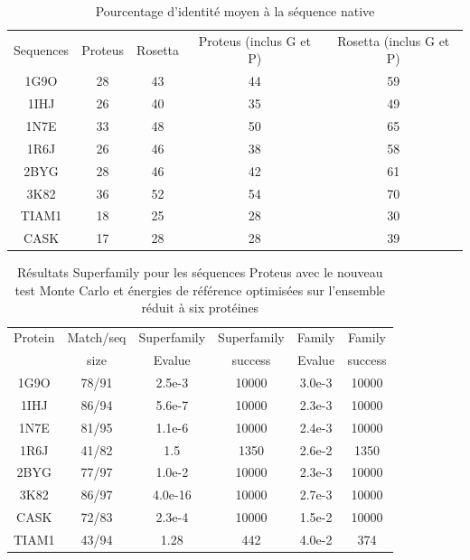     \begin{table}[!htbp]
      \centering

      \begin{tabular}{ccccc}

        \toprule
        Sequences & Proteus & Rosetta & Proteus (inclus G et P) & Rosetta (inclus G et P)\\
        \cmidrule{1-5}
        1G9O  & 28 &  43 & 44 & 59 \\
        1IHJ  & 26 &  40 & 35 & 49 \\
        1N7E  & 33 &  48 & 50 & 65 \\
        1R6J  & 26 &  46 & 38 & 58 \\
        2BYG  & 28 &  46 & 42 & 61 \\
        3K82  & 36 &  52 & 54 & 70 \\
        TIAM1 & 18 &  25 & 28 & 30 \\
        CASK  & 17 &  28 & 28 &  39 \\

        \bottomrule

      \end{tabular}      
      \caption{Pourcentage d'identité moyen à la séquence native}
\label{tab:Entropie_PDZ}      
    \end{table}



\begin{table}[h]
  \raggedleft{}
  
  \begin{tabular}{cccccc}
    
    \toprule
    Protein & Match/seq & Superfamily & Superfamily & Family & Family \\
            & size      & Evalue      & success     & Evalue & success\\
    \cmidrule{1-6}
    1G9O  & 78/91 & 2.5e-3  & 10000 & 3.0e-3 & 10000 \\
    1IHJ  & 86/94 & 5.6e-7  & 10000 & 2.3e-3 & 10000 \\
    1N7E  & 81/95 & 1.1e-6  & 10000 & 2.4e-3 & 10000 \\
    1R6J  & 41/82 & 1.5     &  1350 & 2.6e-2 &  1350 \\
    2BYG  & 77/97 & 1.0e-2  & 10000 & 2.3e-3 & 10000 \\
    3K82  & 86/97 & 4.0e-16 & 10000 & 2.7e-3 & 10000 \\
    \cmidrule{1-6}
    CASK  & 72/83 & 2.3e-4  & 10000 & 1.5e-2 & 10000 \\
    TIAM1 & 43/94 & 1.28    & 442   & 4.0e-2 & 374 \\
    \bottomrule        
  \end{tabular}   
  \caption{Résultats Superfamily pour les séquences Proteus avec le nouveau test Monte Carlo et énergies de référence optimisées sur l'ensemble réduit à six protéines}   
  \label{tab:superfamily_Old_MCtest}       
\end{table}




